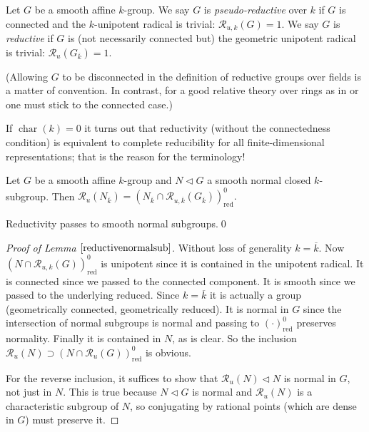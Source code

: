 \documentclass[10pt]{article}
\renewcommand{\(}{\left(}
\renewcommand{\)}{\right)}
\numberwithin{thm}{subsection}
\begin{document}
\begin{defn}\label{reductive}
Let $G$ be a smooth affine $k$-group.
We say $G$ is \textit{pseudo-reductive} over $k$
if $G$ is connected and the $k$-unipotent radical is trivial: $\mathscr{R}_{u,k}(G)=1$.
We say $G$ is \textit{reductive}
if $G$ is (not necessarily connected but) the geometric unipotent radical is trivial: 
 $\mathscr{R}_u(G_{\overline{k}})=1$.
\end{defn}
(Allowing $G$ to be disconnected in the definition of reductive groups over fields
is a matter of convention. In contrast, for a good relative theory over rings as in \cite{sga3} or \cite{luminy} one must
stick to the connected case.)
\begin{rem}\label{}
If $\operatorname{char}(k)=0$
it turns out that reductivity (without the connectedness condition) is
equivalent to complete reducibility for all finite-dimensional representations; that is 
the reason for the terminology!
\end{rem}
\begin{lem}\label{reductivenormalsub}
Let $G$ be a smooth affine $k$-group
and $N\vartriangleleft G$ a smooth normal closed $k$-subgroup.
Then $\mathscr{R}_u(N_{\overline{k}})=(N_{\overline{k}}\cap \mathscr{R}_{u,\overline{k}}(G_{\overline{k}}))^0_\mathrm{red}.$
\end{lem}
\begin{cor}\label{}
Reductivity passes to smooth normal subgroups.\qed 
\end{cor}
\begin{proof}[Proof of Lemma $\ref{reductivenormalsub}$]
 Without loss of generality $k=\overline{k} $.
Now $(N\cap \mathscr{R}_{u,k}(G))^0_\mathrm{red}$
is unipotent since it is contained in the unipotent
radical.
It is connected since we passed to the connected component.
It is smooth since we passed to the underlying reduced.
Since $k=\overline{k} $ it is actually a group
(geometrically connected, geometrically reduced).
It is normal in $G$ since the intersection of normal subgroups is normal
and passing to $(\cdot)^0_\mathrm{red}$ preserves normality.
Finally it is contained in $N$, as is clear.
So the inclusion $\mathscr{R}_{u}(N)\supset (N\cap \mathscr{R}_{u}(G))^0_\mathrm{red}$ is obvious.

For the reverse inclusion, it suffices to show
that $\mathscr{R}_{u}(N)\vartriangleleft N$ is normal in $G$,
not just in $N$.
This is true because $N\vartriangleleft G$ is normal
and $\mathscr{R}_{u}(N)$ is a characteristic subgroup of $N$,
so conjugating by rational points (which are dense in $G$)
must preserve it.
\end{proof}
\end{document}
